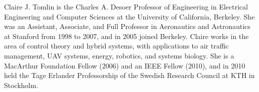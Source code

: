 \vspace{-3cm}
\begin{IEEEbiography}{Claire J. Tomlin} is the Charles A. Desoer Professor of Engineering in Electrical Engineering and Computer Sciences at the University of California, Berkeley. She was an Assistant, Associate, and Full Professor in Aeronautics and Astronautics at Stanford from 1998 to 2007, and in 2005 joined Berkeley. Claire works in the area of control theory and hybrid systems, with applications to air traffic management, UAV systems, energy, robotics, and systems biology. She is a MacArthur Foundation Fellow (2006) and an IEEE Fellow (2010), and in 2010 held the Tage Erlander Professorship of the Swedish Research Council at KTH in Stockholm.
\end{IEEEbiography}